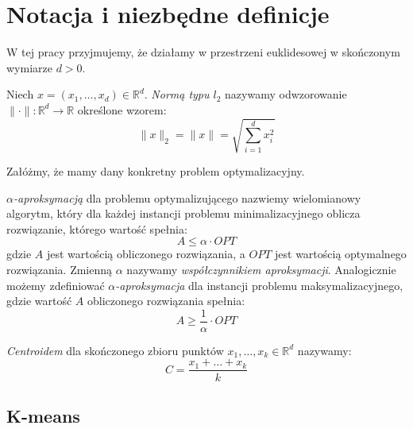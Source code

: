 \chapter{Notacja i niezbędne definicje}\label{preliminaries}

W tej pracy przyjmujemy, że działamy w przestrzeni euklidesowej w skończonym wymiarze $d > 0$.

\begin{definition}
    Niech $x = (x_{1}, \dots, x_{d}) \in \mathbb{R}^{d}$.
    \emph{Normą typu $l_{2}$} nazywamy odwzorowanie $\| \cdot \|: \mathbb{R}^{d} \rightarrow \mathbb{R}$ określone wzorem:
    \begin{equation}
        \|x\|_{2} = \|x\| = \sqrt{ \sum_{i = 1}^{d} x_{i}^{2} }
    \end{equation}
\end{definition}

\noindent
Załóżmy, że mamy dany konkretny problem optymalizacyjny. 

\begin{definition}
    \emph{$\alpha$-aproksymacją} dla problemu optymalizującego nazwiemy wielomianowy algorytm, który dla każdej instancji problemu minimalizacyjnego oblicza rozwiązanie, którego wartość spełnia: 
    \begin{equation}
        A \leq \alpha \cdot OPT
    \end{equation}
    gdzie $A$ jest wartością obliczonego rozwiązania, a $OPT$ jest wartością optymalnego rozwiązania.
    Zmienną $\alpha$ nazywamy \textit{współczynnikiem aproksymacji}.
    Analogicznie możemy zdefiniować  \emph{$\alpha$-aproksymacja} dla instancji problemu maksymalizacyjnego, gdzie wartość $A$ obliczonego rozwiązania spełnia:
    \begin{equation}
        A \geq \frac{1}{\alpha} \cdot OPT
    \end{equation}
\end{definition}

\begin{definition}
    \emph{Centroidem} dla skończonego zbioru punktów $x_{1}, \dots, x_{k} \in \mathbb{R}^{d}$ nazywamy:
    \begin{equation}
        C = \frac{x_{1} + \dots + x_{k}}{k}
    \end{equation}
\end{definition}

\section{K-means}

